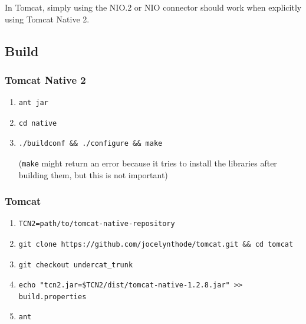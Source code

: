 \documentclass[11pt,a4paper,bibliography=totocnumbered]{scrartcl}
\def\mytitle{Tomcat Native 2}
\begin{document}
In Tomcat, simply using the NIO.2 or NIO connector should work when explicitly using \mytitle{}.

\subsection{Build}
\subsubsection{\mytitle{}}
\begin{enumerate}
	\item \begin{verbatim}ant jar\end{verbatim}
	\item \begin{verbatim}cd native\end{verbatim}
	\item \begin{verbatim}./buildconf && ./configure && make\end{verbatim} (\texttt{make} might return an error because it tries to install the libraries after building them, but this is not important)
\end{enumerate}
\subsubsection{Tomcat}
\begin{enumerate}
	\item \begin{verbatim}TCN2=path/to/tomcat-native-repository\end{verbatim}
	\item \begin{verbatim}git clone https://github.com/jocelynthode/tomcat.git && cd tomcat\end{verbatim}
	\item \begin{verbatim}git checkout undercat_trunk\end{verbatim}
	\item \begin{verbatim}echo "tcn2.jar=$TCN2/dist/tomcat-native-1.2.8.jar" >> build.properties\end{verbatim}
	\item \begin{verbatim}ant\end{verbatim}
\end{enumerate}
\end{document}
